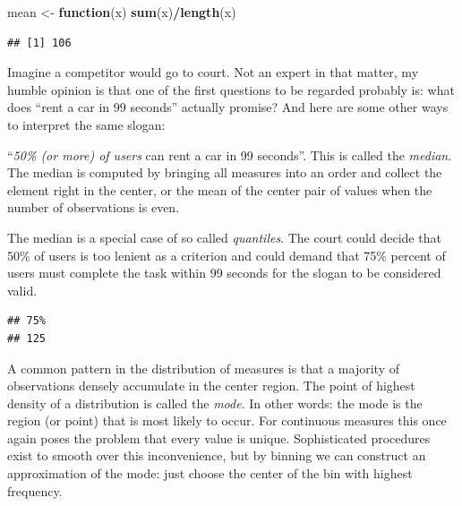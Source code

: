 \documentclass[]{svmono}
\newenvironment{Shaded}{\begin{snugshade}}{\end{snugshade}}
\newcommand{\KeywordTok}[1]{\textcolor[rgb]{0.13,0.29,0.53}{\textbf{#1}}}
\newcommand{\DecValTok}[1]{\textcolor[rgb]{0.00,0.00,0.81}{#1}}
\newcommand{\StringTok}[1]{\textcolor[rgb]{0.31,0.60,0.02}{#1}}
\newcommand{\ControlFlowTok}[1]{\textcolor[rgb]{0.13,0.29,0.53}{\textbf{#1}}}
\newcommand{\OperatorTok}[1]{\textcolor[rgb]{0.81,0.36,0.00}{\textbf{#1}}}
\newcommand{\NormalTok}[1]{#1}
\theoremstyle{definition}
\theoremstyle{definition}
\theoremstyle{definition}
\theoremstyle{remark}
\begin{document}
\begin{Shaded}
\begin{Highlighting}[]
\NormalTok{mean <-}\StringTok{ }\ControlFlowTok{function}\NormalTok{(x) }\KeywordTok{sum}\NormalTok{(x)}\OperatorTok{/}\KeywordTok{length}\NormalTok{(x)}
\end{Highlighting}
\end{Shaded}

\begin{Shaded}
\end{Shaded}

\begin{verbatim}
## [1] 106
\end{verbatim}

Imagine a competitor would go to court. Not an expert in that matter, my
humble opinion is that one of the first questions to be regarded
probably is: what does ``rent a car in 99 seconds'' actually promise?
And here are some other ways to interpret the same slogan:

``\emph{50\% (or more) of users} can rent a car in 99 seconds''. This is
called the \emph{median}. The median is computed by bringing all
measures into an order and collect the element right in the center, or
the mean of the center pair of values when the number of observations is
even.

The median is a special case of so called \emph{quantiles}. The court
could decide that 50\% of users is too lenient as a criterion and could
demand that 75\% percent of users must complete the task within 99
seconds for the slogan to be considered valid.

\begin{Shaded}
\end{Shaded}

\begin{verbatim}
## 75% 
## 125
\end{verbatim}

A common pattern in the distribution of measures is that a majority of
observations densely accumulate in the center region. The point of
highest density of a distribution is called the \emph{mode}. In other
words: the mode is the region (or point) that is most likely to occur.
For continuous measures this once again poses the problem that every
value is unique. Sophisticated procedures exist to smooth over this
inconvenience, but by binning we can construct an approximation of the
mode: just choose the center of the bin with highest frequency.
\end{document}
